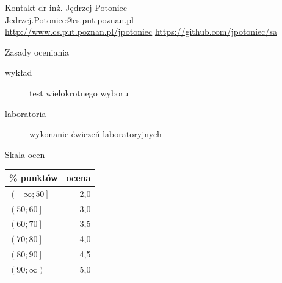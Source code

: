 \documentclass{sa}
\subtitle{Uwagi organizacyjne i wprowadzenie}
\begin{document}
\begin{frame}
\titlepage
\end{frame}
\begin{frame}{Kontakt}
dr inż. Jędrzej Potoniec \\
\url{Jedrzej.Potoniec@cs.put.poznan.pl}\\
\url{http://www.cs.put.poznan.pl/jpotoniec}
\url{https://github.com/jpotoniec/sa}
\end{frame}
\begin{frame}{Zasady oceniania}
\begin{description}
\item[wykład] test wielokrotnego wyboru
\item[laboratoria] wykonanie ćwiczeń laboratoryjnych
\end{description}
\end{frame}
\begin{frame}{Skala ocen}
\begin{center}
\begin{tabular}{l|r}
\% punktów & ocena \\
\hline
$\left(-\infty; 50\right]$ & 2,0 \\
$\left(50; 60\right]$ & 3,0 \\
$\left(60; 70\right]$ & 3,5 \\
$\left(70; 80\right]$ & 4,0 \\
$\left(80; 90\right]$ & 4,5 \\
$\left(90; \infty\right)$ & 5,0 \\
\end{tabular}
\end{center}
\end{frame}
\end{document}
